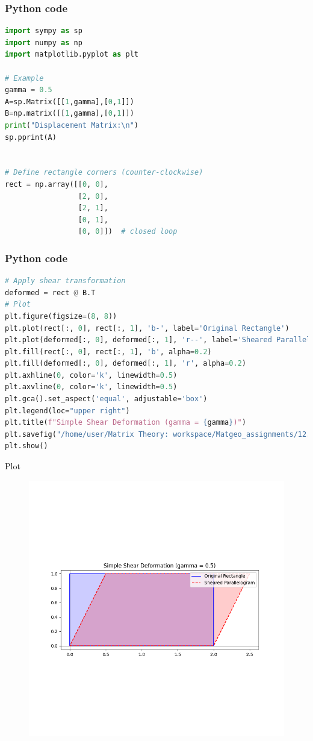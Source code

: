 \documentclass{beamer}
\begin{document}
\begin{frame}[fragile]
    \frametitle{Python code}
    \begin{lstlisting}[language=Python]
import sympy as sp
import numpy as np
import matplotlib.pyplot as plt

# Example
gamma = 0.5 
A=sp.Matrix([[1,gamma],[0,1]])
B=np.matrix([[1,gamma],[0,1]])
print("Displacement Matrix:\n")
sp.pprint(A)


# Define rectangle corners (counter-clockwise)
rect = np.array([[0, 0],
                 [2, 0],
                 [2, 1],
                 [0, 1],
                 [0, 0]])  # closed loop

    \end{lstlisting}   
\end{frame}

\begin{frame}[fragile]
    \frametitle{Python code}
    \begin{lstlisting}[language=Python]
# Apply shear transformation
deformed = rect @ B.T
# Plot
plt.figure(figsize=(8, 8))
plt.plot(rect[:, 0], rect[:, 1], 'b-', label='Original Rectangle')
plt.plot(deformed[:, 0], deformed[:, 1], 'r--', label='Sheared Parallelogram')
plt.fill(rect[:, 0], rect[:, 1], 'b', alpha=0.2)
plt.fill(deformed[:, 0], deformed[:, 1], 'r', alpha=0.2)
plt.axhline(0, color='k', linewidth=0.5)
plt.axvline(0, color='k', linewidth=0.5)
plt.gca().set_aspect('equal', adjustable='box')
plt.legend(loc="upper right")
plt.title(f"Simple Shear Deformation (gamma = {gamma})")
plt.savefig("/home/user/Matrix Theory: workspace/Matgeo_assignments/12.456/figs/Figure_1.png")
plt.show()
    \end{lstlisting}   
\end{frame}

\begin{frame}{Plot}
    \begin{figure}[H]
    \centering
    \includegraphics[width=0.6\columnwidth]{figs/Figure_1.png}
    \label{fig:1}
\end{figure}
\end{frame}
\end{document}
